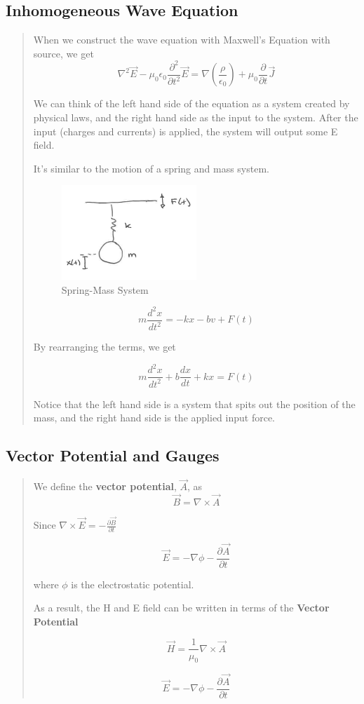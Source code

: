 \documentclass{article} %
\begin{document}
\subsection{Inhomogeneous Wave Equation}
\begin{quote}
    When we construct the wave equation with Maxwell's Equation with source, we get
    \[\nabla^2\vec{E}-\mu_0\epsilon_0 \frac{\partial ^2}{\partial t^2}\vec{E} = \nabla\left(\frac{\rho}{\epsilon_0}\right) + \mu_0 \frac{\partial}{\partial t} \vec{J}\]

    We can think of the left hand side of the equation as a system created by physical laws, and the right hand side as the input to the system. After the input (charges and currents) is applied, the system will output some E field.

    It's similar to the motion of a spring and mass system.

    \begin{figure}[H]
        \centering
        \includegraphics[width=0.5\textwidth]{./image/figure4.png}
        \caption{Spring-Mass System}
    \end{figure}

    \[m \frac{d^2 x}{dt^2} = -kx -bv + F(t)\]

    By rearranging the terms, we get

    \[m \frac{d^2 x}{dt^2} + b\frac{dx}{dt} + kx = F(t)\]

    Notice that the left hand side is a system that spits out the position of the mass, and the right hand side is the applied input force.
\end{quote}

\subsection{Vector Potential and Gauges}
\begin{quote}

    We define the \textbf{vector potential}, $\vec{A}$, as
    \[\vec{B} = \nabla \times \vec{A}\]

    Since $\nabla \times \vec{E} = - \frac{\partial \vec{B}}{\partial t}$




    \[\vec{E} = - \nabla \phi - \frac{\partial \vec{A}}{\partial t}\]

    where $\phi$ is the electrostatic potential.

    \bigskip
    As a result, the H and E field can be written in terms of the \textbf{Vector Potential}

    \[\vec{H} = \frac{1}{\mu_0} \nabla \times \vec{A} \]

    \[\vec{E} = -\nabla\phi - \frac{\partial \vec{A}}{\partial t}\]

\end{quote}
\end{document}
